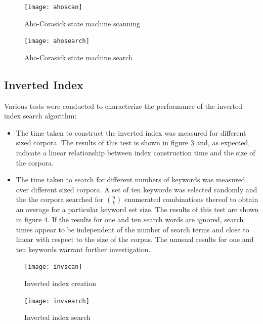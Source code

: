 \documentclass[10pt]{report}
\begin{document}
\begin{figure}
  \begin{center}
	\texttt{[image: ahoscan]}
  \end{center}
  \caption{Aho-Corasick state machine scanning}
  \label{fig:ahoscan}
\end{figure} 

\begin{figure}
  \begin{center}
	\texttt{[image: ahosearch]}
  \end{center}
  \caption{Aho-Corasick state machine search}
  \label{fig:ahosearch}
\end{figure} 


\subsection*{Inverted Index}
Various tests were conducted to characterize the performance of the
inverted index search algorithm:

\begin{itemize}
\item The time taken to construct the inverted index was measured for
  different sized corpora. The results of this test is shown in figure
  \ref{fig:invscan} and, as expected, indicate a linear relationship
  between index construction time and the size of the corpora.

\item The time taken to search for different numbers of keywords was
  measured over different sized corpora. A set of ten keywords was
  selected randomly and the the corpora searched for ${n \choose k}$
  enumerated combinations thereof to obtain an average for a
  particular keyword set size. The results of this test are shown in
  figure \ref{fig:invsearch}. If the results for one and ten search
  words are ignored, search times appear to be independent of the
  number of search terms and close to linear with respect to the size
  of the corpus. The unusual results for one and ten keywords warrant
  further investigation.
\end{itemize}


\begin{figure}
  \begin{center}
	\texttt{[image: invscan]}
  \end{center}
  \caption{Inverted index creation}
  \label{fig:invscan}
\end{figure} 

\begin{figure}
  \begin{center}
	\texttt{[image: invsearch]}
  \end{center}
  \caption{Inverted index search}
  \label{fig:invsearch}
\end{figure} 
\end{document}
